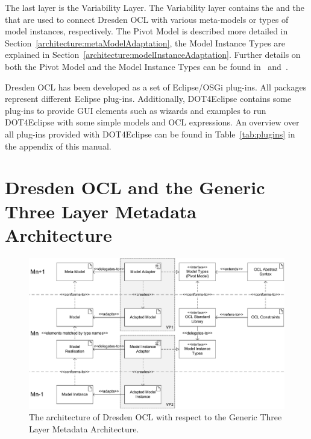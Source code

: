 The last layer is the Variability Layer. The Variability layer contains the
 and the  that are used to
connect Dresden OCL with various meta-models or types of model instances,
respectively. The Pivot Model is described more detailed in
Section~\ref{architecture:metaModelAdaptation}, the Model Instance Types are
explained in Section~\ref{architecture:modelInstanceAdaptation}. Further details
on both the Pivot Model and the Model Instance Types can be found 
in~\cite{braeuerEA:OCL2007} and~\cite{wilkeEA:MODELS2010}.

Dresden OCL has been developed as a set of Eclipse/\acs{OSGi} plug-ins. All
packages represent different Eclipse plug-ins. Additionally, \acl{DOT4Eclipse}
contains some plug-ins to provide \acs{GUI} elements such as wizards and 
examples to run \acl{DOT4Eclipse} with some simple models and \acs{OCL} 
expressions. An overview over all plug-ins provided with \acl{DOT4Eclipse} can
be found in Table~\ref{tab:plugins} in the appendix of this manual.



\section{Dresden OCL and the Generic Three La\-yer Me\-ta\-da\-ta Architecture}
\label{theory:DOTLayers}

\begin{figure}
	\centering
	\includegraphics[width=1.0\linewidth]{figures/architecture/modeladaptation}
	\caption{The architecture of Dresden OCL with respect to the Generic Three Layer
	Metadata Architecture.}
	\label{pic:architecture:genericArchitecture}
\end{figure}

